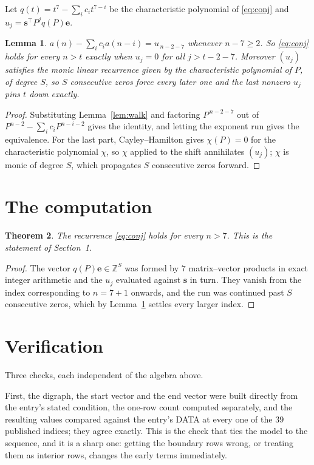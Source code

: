 \documentclass[11pt,a4paper]{article}
\theoremstyle{plain}
\newtheorem{theorem}{Theorem}
\newtheorem{lemma}[theorem]{Lemma}
\theoremstyle{definition}
\begin{document}
Let $q(t)=t^{7}-\sum_i c_i t^{7-i}$ be the characteristic polynomial of
\eqref{eq:conj} and $u_j=\mathbf{s}^{\!\top}P^{j}q(P)\mathbf{e}$.

\begin{lemma}\label{lem:crit}
$a(n)-\sum_i c_i a(n-i)=u_{\,n-2-7}$ whenever $n-7\ge2$. So \eqref{eq:conj}
holds for every $n>t$ exactly when $u_j=0$ for all $j>t-2-7$. Moreover $(u_j)$
satisfies the monic linear recurrence given by the characteristic polynomial of $P$, of
degree $S$, so $S$ consecutive zeros force every later one and the last nonzero $u_j$ pins
$t$ down exactly.
\end{lemma}

\begin{proof}
Substituting Lemma~\ref{lem:walk} and factoring $P^{\,n-2-7}$ out of
$P^{n-2}-\sum_i c_i P^{n-i-2}$ gives the identity, and letting the exponent run gives the
equivalence. For the last part, Cayley--Hamilton gives $\chi(P)=0$ for the characteristic
polynomial $\chi$, so $\chi$ applied to the shift annihilates $(u_j)$; $\chi$ is monic of
degree $S$, which propagates $S$ consecutive zeros forward.
\end{proof}

\section{The computation}

\begin{theorem}
The recurrence \eqref{eq:conj} holds for every $n>7$. This is the statement of
Section~1.
\end{theorem}

\begin{proof}
The vector $q(P)\mathbf{e}\in\mathbb{Z}^{S}$ was formed by $7$ matrix--vector
products in exact integer arithmetic and the $u_j$ evaluated against $\mathbf{s}$ in turn.
They vanish from the index corresponding to $n=7+1$ onwards, and the run was continued
past $S$ consecutive zeros, which by Lemma~\ref{lem:crit} settles every larger index.
\end{proof}

\section{Verification}

Three checks, each independent of the algebra above.

First, the digraph, the start vector and the end vector were built directly from the
entry's stated condition, the one-row count computed separately, and the resulting values
compared against the entry's DATA at every one of the $39$ published indices; they
agree exactly. This is the check that ties the model to the sequence, and it is a sharp one:
getting the boundary rows wrong, or treating them as interior rows, changes the early terms
immediately.
\end{document}
